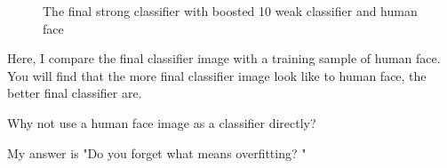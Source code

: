 \documentclass[a4paper, 11pt]{article} %
\begin{document}
    \begin{figure}[H]
        \label{fig:float}
        \caption{The final strong classifier with boosted 10 weak classifier and human face}
    \end{figure}
    Here, I compare the final classifier image with a training sample of human face. You will find that the more final classifier image look like to human face, the better final classifier are.

    Why not use a human face image as a classifier directly?

    My answer is "Do you forget what means overfitting? "

\clearpage
\end{document}

